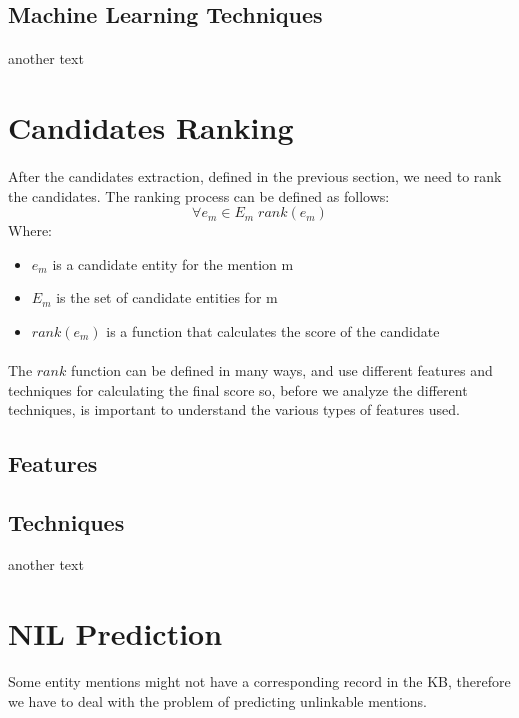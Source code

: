 \subsection{Machine Learning Techniques}
\paragraph{}
another text

\section{Candidates Ranking}
\paragraph{}
After the candidates extraction, defined in the previous section, we need to rank the candidates. The ranking process can be defined as follows:
\[\forall e_m \in E_m \; rank(e_m)\]
Where:

\begin{itemize}[noitemsep,  topsep=10pt]
\item $e_m$ is a candidate entity for the mention m
\item $E_m$ is the set of candidate entities for m
\item $rank(e_m)$ is a function that calculates the score of the candidate
\end{itemize}

\paragraph{}
The $rank$ function can be defined in many ways, and use different features and techniques for calculating the final score so, before we analyze the different techniques, is important to understand the various types of features used.

\subsection{Features}


\subsection{Techniques} 
another text

\section{NIL Prediction}
\paragraph{}
Some entity mentions might not have a corresponding record in the KB, therefore we have to deal with the problem of predicting unlinkable mentions. 